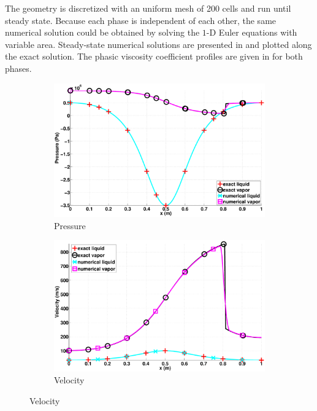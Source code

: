 \documentclass[preprint,10pt]{elsarticle}
\begin{document}
%
The geometry is discretized with an uniform mesh of 200 cells and run until steady state. Because each phase is independent of each other, the same numerical solution could be obtained by solving the $1$-D Euler equations with variable area. Steady-state numerical solutions are presented in  and plotted along the exact solution. The phasic viscosity coefficient profiles are given in  for both phases.
%
\begin{figure}[H]
        \centering
        \begin{subfigure}[b]{0.495\textwidth}
                \centering
                \includegraphics[width=\textwidth]{figures/nozzle-indep-phase_two_phases_pressure.eps}
                \caption{Pressure}
                \label{fig:nozzle-indep-press}
        \end{subfigure}        
        \begin{subfigure}[b]{0.495\textwidth}
                \centering
                \includegraphics[width=\textwidth]{figures/nozzle-indep-phase_two_phases_velocity.eps}
                \caption{Velocity}
                \label{fig:nozzle-indep-vel}
        \end{subfigure}%


\end{figure}
\end{document}
